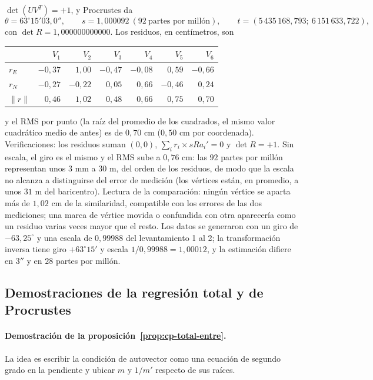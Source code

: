\(\det(UV^T)=+1\), y Procrustes da
\[
  \theta=63^\circ15'03{,}0'',\qquad s=1{,}000092\ (92\ \text{partes por millón}),\qquad
  t=(5\,435\,168{,}793;\ 6\,151\,633{,}722),
\]
con \(\det R=1{,}000000000000\). Los residuos, en centímetros, son
\begin{center}
\small
\begin{tabular}{lrrrrrr}
\toprule
& \(V_1\) & \(V_2\) & \(V_3\) & \(V_4\) & \(V_5\) & \(V_6\)\\
\midrule
\(r_E\) & \(-0{,}37\) & \(1{,}00\) & \(-0{,}47\) & \(-0{,}08\) & \(0{,}59\) & \(-0{,}66\)\\
\(r_N\) & \(-0{,}27\) & \(-0{,}22\) & \(0{,}05\) & \(0{,}66\) & \(-0{,}46\) & \(0{,}24\)\\
\(\lVert r\rVert\) & \(0{,}46\) & \(1{,}02\) & \(0{,}48\) & \(0{,}66\) & \(0{,}75\) & \(0{,}70\)\\
\bottomrule
\end{tabular}
\end{center}
y el RMS por punto (la raíz del promedio de los cuadrados, el mismo valor cuadrático medio de
antes) es de \(0{,}70\) cm (\(0{,}50\) cm por coordenada). Verificaciones: los
residuos suman \((0,0)\), \(\sum_ir_i\times sRa_i'=0\) y \(\det R=+1\). Sin escala, el giro es
el mismo y el RMS sube a \(0{,}76\) cm: las \(92\) partes por millón representan unos
\(3\) mm a \(30\) m, del orden de los residuos, de modo que la escala no
alcanza a distinguirse del error de medición (los vértices están, en promedio, a unos \(31\) m del
baricentro). Lectura de la comparación: ningún vértice se
aparta más de \(1{,}02\) cm de la similaridad, compatible con los errores de las dos
mediciones; una marca de vértice movida o confundida con otra aparecería como un residuo
varias veces mayor que el resto. Los datos se generaron con un giro de \(-63{,}25^\circ\) y una escala de
\(0{,}99988\) del levantamiento 1 al 2; la transformación inversa tiene giro
\(+63^\circ15'\) y escala \(1/0{,}99988=1{,}00012\), y la estimación difiere en
\(3''\) y en \(28\) partes por millón.

\subsection{Demostraciones de la regresión total y de Procrustes}\label{sec:cp-demostraciones}

\paragraph{Demostración de la proposición~\ref{prop:cp-total-entre}.} La idea es escribir la
condición de autovector como una ecuación de segundo grado en la pendiente y ubicar \(m\) y
\(1/m'\) respecto de sus raíces.

